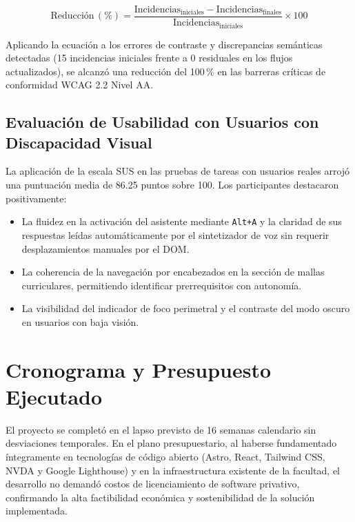 \begin{equation}
\label{eq:mejora}
\text{Reducción}\,(\%) = \frac{\text{Incidencias}_{\text{iniciales}} - \text{Incidencias}_{\text{finales}}}{\text{Incidencias}_{\text{iniciales}}} \times 100
\end{equation}

Aplicando la ecuación a los errores de contraste y discrepancias semánticas detectadas (15 incidencias iniciales frente a 0 residuales en los flujos actualizados), se alcanzó una reducción del 100\,\% en las barreras críticas de conformidad WCAG 2.2 Nivel AA.

\subsection{Evaluación de Usabilidad con Usuarios con Discapacidad Visual}
La aplicación de la escala SUS en las pruebas de tareas con usuarios reales arrojó una puntuación media de 86.25 puntos sobre 100. Los participantes destacaron positivamente:
\begin{itemize}
  \item La fluidez en la activación del asistente mediante \texttt{Alt+A} y la claridad de sus respuestas leídas automáticamente por el sintetizador de voz sin requerir desplazamientos manuales por el DOM.
  \item La coherencia de la navegación por encabezados en la sección de mallas curriculares, permitiendo identificar prerrequisitos con autonomía.
  \item La visibilidad del indicador de foco perimetral y el contraste del modo oscuro en usuarios con baja visión.
\end{itemize}

\section{Cronograma y Presupuesto Ejecutado}
El proyecto se completó en el lapso previsto de 16 semanas calendario sin desviaciones temporales. En el plano presupuestario, al haberse fundamentado íntegramente en tecnologías de código abierto (Astro, React, Tailwind CSS, NVDA y Google Lighthouse) y en la infraestructura existente de la facultad, el desarrollo no demandó costos de licenciamiento de software privativo, confirmando la alta factibilidad económica y sostenibilidad de la solución implementada.
